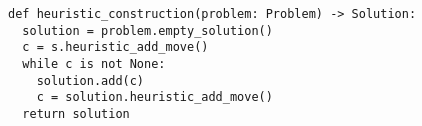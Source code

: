 \begin{lstlisting}[float=htpb,caption={Heuristic Construction Solver},label=lst:hc]
def heuristic_construction(problem: Problem) -> Solution:
  solution = problem.empty_solution()
  c = s.heuristic_add_move()
  while c is not None:
    solution.add(c)
    c = solution.heuristic_add_move()
  return solution
\end{lstlisting}